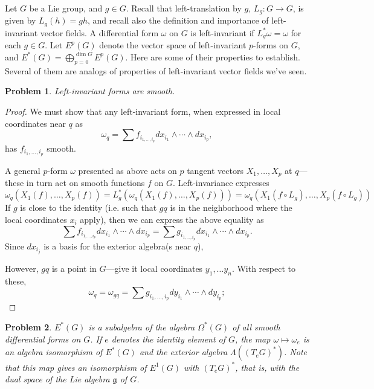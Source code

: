 \documentclass{article}
\newtheorem{plm}{Problem}
\begin{document}
Let $G$ be a Lie group, and $g \in G$.
Recall that left-translation by $g$, $L_{g}: G \to G$, is given by $L_{g}(h) = gh$,
and recall also the definition and importance of left-invariant vector fields.
A differential form $\omega$ on $G$ is left-invariant if $L_{g}^{*}\omega = \omega$ for each $g \in G$.
Let $E^{p}(G)$ denote the vector space of left-invariant $p$-forms on $G$, and $E^{*}(G) = \bigoplus_{p = 0}^{\dim G}E^{p}(G)$.
Here are some of their properties to establish.
Several of them are analogs of properties of left-invariant vector fields we've seen.

\begin{plm}
  Left-invariant forms are smooth.
\end{plm}

\begin{proof}
  We must show that any left-invariant form, when expressed in local coordinates near $q$ as
  \[
    \omega_{q} = \sum f_{i_{1, \ldots, i_{p}}}dx_{i_{1}} \wedge \cdots \wedge dx_{i_{p}},
  \]
  has $f_{i_{1}, \ldots, i_{p}}$ smooth.

  A general $p$-form $\omega$ presented as above acts on $p$ tangent vectors $X_{1}, \ldots, X_{p}$ at $q$---these
  in turn act on smooth functions $f$ on $G$.
  Left-invariance expresses
  \[
    \omega_{q}(X_{1}(f), \ldots, X_{p}(f)) = L_{g}^{*}(\omega_{q}(X_{1}(f), \ldots, X_{p}(f)))
    = \omega_{q }(X_{1}(f \circ L_{g}), \ldots, X_{p}(f \circ L_{g}))
  \]
  If $g$ is close to the identity (i.e. such that $gq$ is in the neighborhood where the local coordinates $x_{i}$ apply),
  then we can express the above equality as
  \[
    \sum f_{i_{1, \ldots, i_{p}}}dx_{i_{1}} \wedge \cdots \wedge dx_{i_{p}}
    = \sum g_{i_{1, \ldots, i_{p}}}dx_{i_{1}} \wedge \cdots \wedge dx_{i_{p}}.
  \]
  Since $dx_{i_{j}}$ is a basis for the exterior algebra(s near $q$),
  
  However, $gq$ is a point in $G$---give it local coordinates $y_{1}, \ldots y_{n}$.
  With respect to these,
  \[
    \omega_{q} = \omega_{gq} = \sum g_{i_{1}, \ldots, i_{p}} dy_{i_{1}} \wedge \cdots \wedge dy_{i_{p}};
  \]

\end{proof}

\begin{plm}
  $E^{*}(G)$ is a subalgebra of the algebra $\Omega^{*}(G)$ of all smooth differential forms on $G$.
  If $e$ denotes the identity element of $G$, the map $\omega \mapsto \omega_{e}$ is an algebra isomorphism of $E^{*}(G)$
  and the exterior algebra $\Lambda((T_{e}G)^{*})$.
  Note that this map gives an isomorphism of $E^{1}(G)$ with $(T_{e}G)^{*}$, that is, with the dual space of the Lie algebra $\mathfrak{g}$
  of $G$.
\end{plm}
\end{document}

